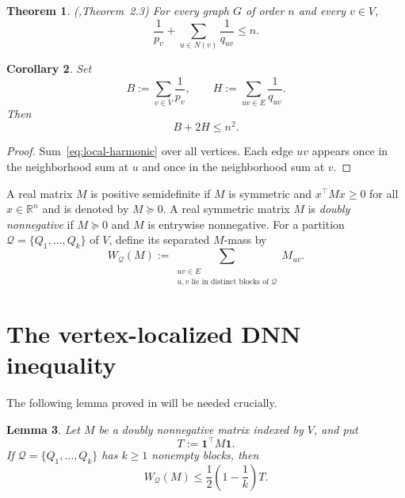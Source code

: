 \documentclass[11pt]{article}
\numberwithin{equation}{section}
\newtheorem{theorem}{Theorem}[section]
\newtheorem{lemma}[theorem]{Lemma}
\newtheorem{corollary}[theorem]{Corollary}
\theoremstyle{definition}
\theoremstyle{remark}
\newcommand{\one}{\mathbf 1}
\begin{document}
	\begin{theorem}(\cite{liu2026positive},Theorem~2.3)
		\label{thm:LTZ-local-harmonic}
		For every graph $G$ of order $n$ and every $v\in V$,
		\begin{equation}\label{eq:local-harmonic}
			\frac1{p_v}
			+
			\sum_{u\in N(v)}\frac1{q_{uv}}
			\leq n.
		\end{equation}
	\end{theorem}
	
	\begin{corollary}\label{cor:global-harmonic}
		Set
		\begin{equation}\label{eq:B-H-def}
			B:=\sum_{v\in V}\frac1{p_v},
			\qquad
			H:=\sum_{uv\in E}\frac1{q_{uv}}.
		\end{equation}
		Then
		\begin{equation}\label{eq:B-plus-2H}
			B+2H\leq n^2.
		\end{equation}
	\end{corollary}
	
	\begin{proof}
		Sum~\eqref{eq:local-harmonic} over all vertices.  Each edge $uv$ appears
		once in the neighborhood sum at $u$ and once in the neighborhood sum at
		$v$.
	\end{proof}
	
	A real matrix $M$ is positive semidefinite if $M$ is symmetric and $x^{\top}Mx \geq 0$ for all $ x \in \mathbb{R}^n$ and is denoted by $M \succeq 0$. A real symmetric matrix $M$ is \emph{doubly nonnegative} if $M\succeq0$
	and $M$ is entrywise nonnegative.  For a partition
	$\mathcal Q=\{Q_1,\ldots,Q_k\}$ of $V$, define its separated
	$M$-mass by
	\[
	W_{\mathcal Q}(M)
	:=
	\sum_{\substack{uv\in E\\
			u,v\text{ lie in distinct blocks of }\mathcal Q}}
	M_{uv}.
	\]
	
	
	
	\section{The vertex-localized DNN inequality}\label{sec:localized-DNN}
	The following lemma proved in \cite{liu2026positive} will be needed crucially.
	\begin{lemma}\cite{liu2026positive}
		\label{lem:DNN-partition}
		Let $M$ be a doubly nonnegative matrix indexed by $V$, and put
		\begin{equation} \label{eq:T-def}
			T:=\one^{\top}M\one.
		\end{equation}
		If $\mathcal Q=\{Q_1,\ldots,Q_k\}$ has $k\geq1$ nonempty blocks, then
		\begin{equation}\label{eq:DNN-partition}
			W_{\mathcal Q}(M)
			\leq
			\frac12\left(1-\frac1k\right)T.
		\end{equation}
	\end{lemma}
	
\end{document}
